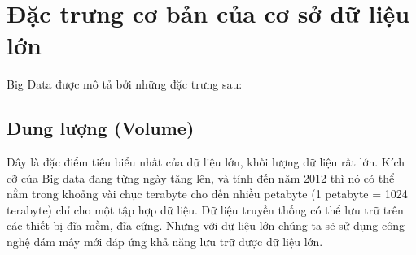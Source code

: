 \documentclass[12pt,a4paper]{report}
\begin{document}
	\section{Đặc trưng cơ bản của cơ sở dữ liệu lớn}
	Big Data được mô tả bởi những đặc trưng sau:
	\subsection{Dung lượng (Volume)}
	Đây là đặc điểm tiêu biểu nhất của dữ liệu lớn, khối lượng dữ liệu rất lớn. Kích cỡ của Big data đang từng ngày tăng lên, và tính đến năm 2012 thì nó có thể nằm trong khoảng vài chục terabyte cho đến nhiều petabyte (1 petabyte = 1024 terabyte) chỉ cho một tập hợp dữ liệu. Dữ liệu truyền thống có thể lưu trữ trên các thiết bị đĩa mềm, đĩa cứng. Nhưng với dữ liệu lớn chúng ta sẽ sử dụng công nghệ đám mây mới đáp ứng khả năng lưu trữ được dữ liệu lớn.
\end{document}
